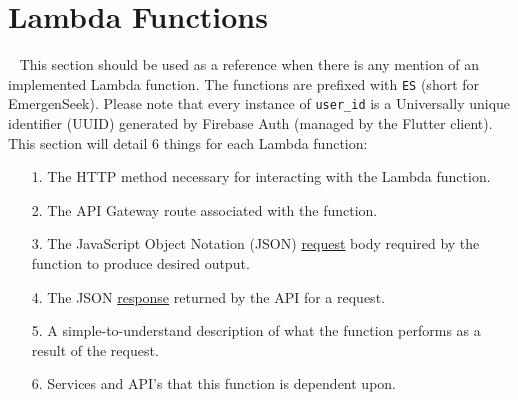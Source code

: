 \documentclass[10pt, a4paper]{article}
\begin{document}
\section{Lambda Functions}
\label{sec:lf}
\par ~ This section should be used as a reference when there is any mention of an implemented Lambda function. The functions are prefixed with \texttt{ES} (short for EmergenSeek). Please note that every instance of \texttt{user\_id} is a Universally unique identifier (UUID) generated by Firebase Auth (managed by the Flutter client). This section will detail 6 things for each Lambda function:
	\begin{enumerate}
		\item[1.] The HTTP method necessary for interacting with the Lambda function.
		\item[2.] The API Gateway route associated with the function.
		\item[3.] The JavaScript Object Notation (JSON) \underline{request} body required by the function to produce desired output.
		\item[4.] The JSON \underline{response} returned by the API for a request.
		\item[5.] A simple-to-understand description of what the function performs as a result of the request.
		\item[6.] Services and API's that this function is dependent upon.
	\end{enumerate}
	
\end{document}
